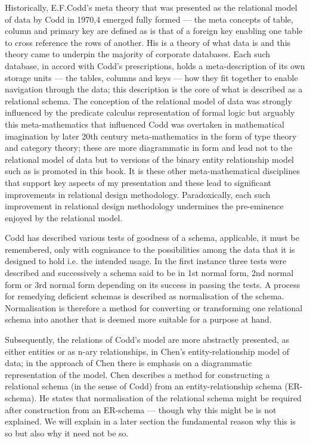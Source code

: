 \mynote Historically, E.F.Codd's meta theory that was presented as the relational model of data by Codd in 1970,4 emerged fully formed — the meta concepts of table, column and primary key are defined as is that of a foreign key enabling one table to cross reference the rows of another. His is a theory of what data is and this theory came to underpin the majority of corporate databases. Each such database, in accord with Codd's prescriptions, holds a meta-description of its own storage units --- the tables, columns and keys ---  how they fit together to enable navigation through the data; this description is the core of what is described as a relational schema. 
The conception of the relational model of data was strongly influenced by the predicate calculus representation of formal logic but arguably this meta-mathematics that influenced Codd was overtaken in mathematical imagination by later 20th century meta-mathematics in the form of type theory and category theory; these are more diagrammatic in form and lead not to the relational model of data but to versions of the binary entity relationship model such as is promoted in this book. 
It is these other meta-mathematical disciplines that support key aspects of my presentation and these lead to significant improvements in relational design methodology. Paradoxically, each such improvement in relational design methodology undermines the pre-eminence enjoyed by the relational model.

\mynote Codd has described various tests of goodness of a schema, applicable, it must be remembered, only with cognisance to the possibilities among the data that it is designed to hold i.e. the intended usage. In the first instance three tests were described and successively a schema said to be in 1st normal form, 2nd normal form or 3rd normal form depending on its success in passing the tests. A process for remedying deficient schemas is described as normalisation of the schema. Normalisation is therefore a method for converting or transforming one relational schema into another that is deemed more suitable for a purpose at hand.

\mynote Subsequently, the relations of Codd's model are more abstractly presented, as either entities or as n-ary relationships, in Chen's entity-relationship model of data; in the approach of Chen there is emphasis on a diagrammatic representation of the model. Chen describes a method for constructing a relational schema (in the sense of Codd) from an entity-relationship schema (ER-schema). He states that normalisation of the relational schema might be required after construction from an ER-schema — though why this might be is not explained. We will explain in a later section the fundamental reason why this is so but also why it need not be so.

